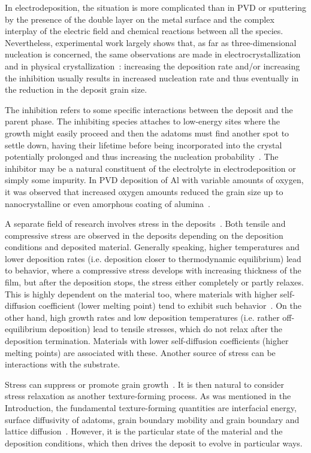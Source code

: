 In electrodeposition, the situation is more complicated than in PVD or sputtering by the presence of the double layer on the metal surface and the complex interplay of the electric field and chemical reactions between all the species.  Nevertheless, experimental work largely shows that, as far as three-dimensional nucleation is concerned, the same observations are made in electrocrystallization
and in physical crystallization~\cite{Winand1992}: increasing the deposition rate and/or increasing the inhibition usually results in increased nucleation rate and thus eventually in the reduction in the deposit grain size.

The inhibition refers to some specific interactions between the deposit and the parent phase. The inhibiting species attaches to low-energy sites where the growth might easily proceed and then the adatoms must find another spot to settle down, having their lifetime before being incorporated into the crystal potentially prolonged and thus increasing the nucleation probability~\cite{Winand1992}. The inhibitor may be a natural constituent of the electrolyte in electrodeposition or simply some impurity. In PVD deposition of Al with variable amounts of oxygen, it was observed that increased oxygen amounts reduced the grain size up to nanocrystalline or even amorphous coating of alumina~\cite{Barna1998}.

A separate field of research involves stress in the deposits~\cite{Thornton1989, Thompson1993, Chason2015, Abadias2018}. Both tensile and compressive stress are observed in the deposits depending on the deposition conditions and deposited material. Generally speaking, higher temperatures and lower deposition rates (i.e. deposition closer to thermodynamic equilibrium) lead to behavior, where a compressive stress develops with increasing thickness of the film, but after the deposition stops, the stress either completely or partly relaxes. This is highly dependent on the material too, where materials with higher self-diffusion coefficient (lower melting point) tend to exhibit such behavior~\cite{Chason2002}. On the other hand, high growth rates and low deposition temperatures (i.e. rather off-equilibrium deposition) lead to tensile stresses, which do not relax after the deposition termination. Materials with lower self-diffusion coefficients (higher melting points) are associated with these. Another source of stress can be interactions with the substrate.

Stress can suppress or promote grain growth~\cite{Thompson1993}. It is then natural to consider stress relaxation as another texture-forming process. As was mentioned in the Introduction, the fundamental texture-forming quantities are interfacial energy, surface diffusivity of adatoms, grain boundary mobility and grain boundary and lattice diffusion~\cite{Szpunar1997, Suwas2014}. However, it is the particular state of the material and the deposition conditions, which then drives the deposit to evolve in particular ways.

